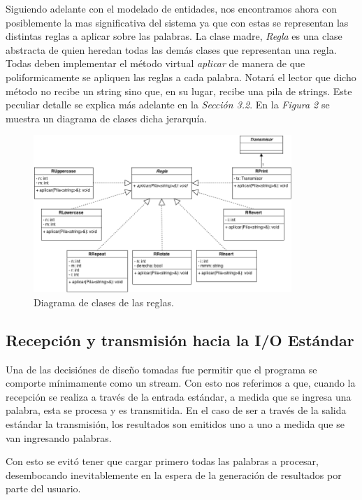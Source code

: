 \documentclass{article}
\begin{document}
	Siguiendo adelante con el modelado de entidades, nos encontramos ahora con posiblemente la mas significativa del sistema ya que con estas se representan las distintas reglas a aplicar sobre las palabras. La clase madre, \textit{Regla} es una clase abstracta de quien heredan todas las demás clases que representan una regla. Todas deben implementar el método virtual \textit{aplicar} de manera de que poliformicamente se apliquen las reglas a cada palabra. Notará el lector que dicho método no recibe un string sino que, en su lugar, recibe una pila de strings. Este peculiar detalle se explica más adelante en la \textit{Sección 3.2}. En la \textit{Figura 2} se muestra un diagrama de clases dicha jerarquía.
\bigskip


\begin{figure}[h]
	\centering
	\includegraphics[width=0.87\textwidth]{images/diagrama_3.png}
	\medskip
	\caption{Diagrama de clases de las reglas.}
\end{figure}
\bigskip


\subsection{Recepción y transmisión hacia la I/O Estándar}

	Una de las decisiónes de diseño tomadas fue permitir que el programa se comporte mínimamente como un stream. Con esto nos referimos a que, cuando la recepción se realiza a través de la entrada estándar, a medida que se ingresa una palabra, esta se procesa y es transmitida. En el caso de ser a través de la salida estándar la transmisión, los resultados son emitidos uno a uno a medida que se van ingresando palabras.
	\par
	Con esto se evitó tener que cargar primero todas las palabras a procesar, desembocando inevitablemente en la espera de la generación de resultados por parte del usuario.
\bigskip\medskip
\end{document}
